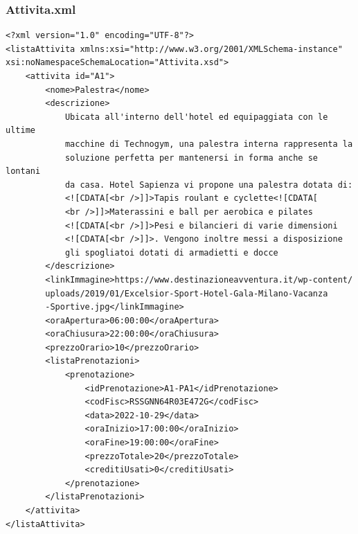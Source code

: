 \documentclass [a4paper, 12pt]{book}
\begin{document}
\subsubsection{Attivita.xml}
\begin{lstlisting}[style=XML]
<?xml version="1.0" encoding="UTF-8"?>
<listaAttivita xmlns:xsi="http://www.w3.org/2001/XMLSchema-instance" xsi:noNamespaceSchemaLocation="Attivita.xsd">
    <attivita id="A1">
        <nome>Palestra</nome>
        <descrizione>
            Ubicata all'interno dell'hotel ed equipaggiata con le ultime
            macchine di Technogym, una palestra interna rappresenta la
            soluzione perfetta per mantenersi in forma anche se lontani
            da casa. Hotel Sapienza vi propone una palestra dotata di:
            <![CDATA[<br />]]>Tapis roulant e cyclette<![CDATA[
            <br />]]>Materassini e ball per aerobica e pilates
            <![CDATA[<br />]]>Pesi e bilancieri di varie dimensioni
            <![CDATA[<br />]]>. Vengono inoltre messi a disposizione
            gli spogliatoi dotati di armadietti e docce
        </descrizione>
        <linkImmagine>https://www.destinazioneavventura.it/wp-content/
        uploads/2019/01/Excelsior-Sport-Hotel-Gala-Milano-Vacanza
        -Sportive.jpg</linkImmagine>
        <oraApertura>06:00:00</oraApertura>
        <oraChiusura>22:00:00</oraChiusura>
        <prezzoOrario>10</prezzoOrario>
        <listaPrenotazioni>
            <prenotazione>
            	<idPrenotazione>A1-PA1</idPrenotazione>
                <codFisc>RSSGNN64R03E472G</codFisc>
                <data>2022-10-29</data>
                <oraInizio>17:00:00</oraInizio>
                <oraFine>19:00:00</oraFine>
                <prezzoTotale>20</prezzoTotale>
                <creditiUsati>0</creditiUsati>
            </prenotazione>
        </listaPrenotazioni>
    </attivita>
</listaAttivita>
\end{lstlisting}
\end{document}
